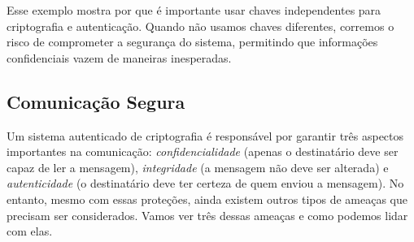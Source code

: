 Esse exemplo mostra por que é importante usar chaves independentes para criptografia e autenticação.
Quando não usamos chaves diferentes, corremos o risco de comprometer a segurança do sistema, permitindo que informações confidenciais vazem de maneiras inesperadas.

\subsection{Comunicação Segura}
\label{sec:comunicacao-segura}

Um sistema autenticado de criptografia é responsável por garantir três aspectos importantes na comunicação:
{\em confidencialidade} (apenas o destinatário deve ser capaz de ler a mensagem), {\em integridade} (a mensagem não deve ser alterada) e {\em autenticidade} (o destinatário deve ter certeza de quem enviou a mensagem).
No entanto, mesmo com essas proteções, ainda existem outros tipos de ameaças que precisam ser considerados.
Vamos ver três dessas ameaças e como podemos lidar com elas.



